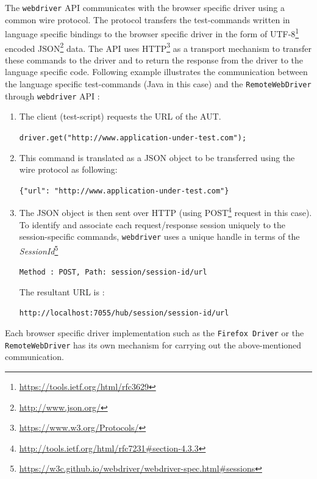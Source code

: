 The \texttt{webdriver} API communicates with the browser specific driver using a common wire protocol. The protocol transfers the test-commands written in language specific bindings to the browser specific driver in the form of UTF-8\footnote{\url{https://tools.ietf.org/html/rfc3629}} encoded JSON\footnote{\url{http://www.json.org/}} data. The API uses HTTP\footnote{\url{https://www.w3.org/Protocols/}} as a transport mechanism to transfer these commands to the driver and to return the response from the driver to the language specific code. 
\noindent 
Following example illustrates the communication between the language specific test-commands (Java in this case) and the \texttt{RemoteWebDriver} through \texttt{webdriver} API :
\begin{enumerate}
\item The client (test-script) requests the URL of the AUT.\\
\begin{small}
\texttt{driver.get("http://www.application-under-test.com");}
\end{small}
\item This command is translated as a JSON object to be transferred using the wire protocol as following:\\
\begin{small}
\texttt{\{"url": "http://www.application-under-test.com"\}}
\end{small}
\item The JSON object is then sent over HTTP (using POST\footnote{\url{http://tools.ietf.org/html/rfc7231\#section-4.3.3}} request in this case). To identify and associate each request/response session uniquely to the session-specific commands, \texttt{webdriver} uses a unique handle in terms of the \textit{SessionId}\footnote{\url{https://w3c.github.io/webdriver/webdriver-spec.html\#sessions}}\\
\begin{small}
\texttt{Method : POST, Path: session/{session-id}/url}\\
\end{small}
The resultant URL is :\\
\begin{small}
\texttt{http://localhost:7055/hub/session/{session-id}/url}
\end{small}
\end{enumerate}

Each browser specific driver implementation such as the \texttt{Firefox Driver} or the \texttt{RemoteWebDriver} has its own mechanism for carrying out the above-mentioned communication. 

